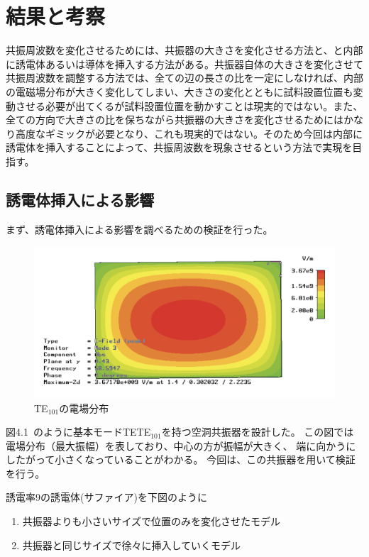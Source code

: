 \chapter{結果と考察}
共振周波数を変化させるためには、共振器の大きさを変化させる方法と、と内部に誘電体あるいは導体を挿入する方法がある。共振器自体の大きさを変化させて共振周波数を調整する方法では、全ての辺の長さの比を一定にしなければ、内部の電磁場分布が大きく変化してしまい、大きさの変化とともに試料設置位置も変動させる必要が出てくるが試料設置位置を動かすことは現実的ではない。また、全ての方向で大きさの比を保ちながら共振器の大きさを変化させるためにはかなり高度なギミックが必要となり、これも現実的ではない。そのため今回は内部に誘電体を挿入することによって、共振周波数を現象させるという方法で実現を目指す。


\section{誘電体挿入による影響}
まず、誘電体挿入による影響を調べるための検証を行った。

\vspace{10 mm}

\begin{figure}[h]
  \begin{center}
    \includegraphics[width=12cm]{./image/te101.png}
    \caption{TE$_{101}$の電場分布}
    \label{fig:E-TE101}
  \end{center}
\end{figure}

図4.1 のように基本モードTETE$_{101}$を持つ空洞共振器を設計した。
この図では電場分布（最大振幅）を表しており、中心の方が振幅が大きく、
端に向かうにしたがって小さくなっていることがわかる。
今回は、この共振器を用いて検証を行う。

誘電率9の誘電体(サファイア)を下図のように

\begin{enumerate}
  \item 共振器よりも小さいサイズで位置のみを変化させたモデル
  \item 共振器と同じサイズで徐々に挿入していくモデル
\end{enumerate}

